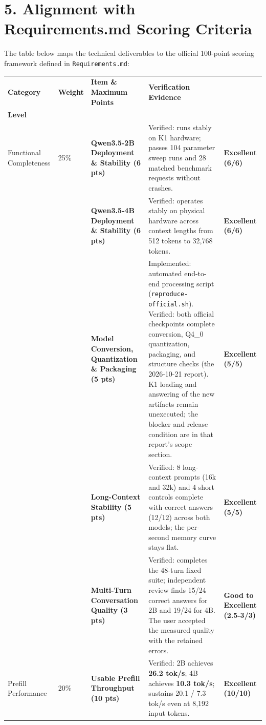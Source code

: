 \documentclass[10pt,a4paper]{article}
\begin{document}
\section{5. Alignment with Requirements.md Scoring Criteria}

The table below maps the technical deliverables to the official 100-point scoring framework defined in \texttt{Requirements.md}:

\begin{scriptsize}
\setlength{\tabcolsep}{1.5pt}
\begin{longtable}{@{}>{\raggedright\arraybackslash}p{2.6cm}p{1.1cm}p{4.1cm}p{5.7cm}p{2.5cm}@{}}
\toprule
\textbf{Category} & \textbf{Weight} & \textbf{Item \& Maximum Points} & \textbf{Verification Evidence} & \shortstack{\textbf{Rating}\\\textbf{Level}} \\
\midrule
\endhead
Functional Completeness & 25\% & \textbf{Qwen3.5-2B Deployment \& Stability (6 pts)} & Verified: runs stably on K1 hardware; passes 104 parameter sweep runs and 28 matched benchmark requests without crashes. & \textbf{Excellent (6/6)} \\
 & & \textbf{Qwen3.5-4B Deployment \& Stability (6 pts)} & Verified: operates stably on physical hardware across context lengths from 512 tokens to 32,768 tokens. & \textbf{Excellent (6/6)} \\
 & & \textbf{Model Conversion, Quantization \& Packaging (5 pts)} & Implemented: automated end-to-end processing script (\texttt{reproduce-official.sh}). Verified: both official checkpoints complete conversion, Q4\_0 quantization, packaging, and structure checks (the 2026-10-21 report). K1 loading and answering of the new artifacts remain unexecuted; the blocker and release condition are in that report's scope section. & \textbf{Excellent (5/5)} \\
 & & \textbf{Long-Context Stability (5 pts)} & Verified: 8 long-context prompts (16k and 32k) and 4 short controls complete with correct answers (12/12) across both models; the per-second memory curve stays flat. & \textbf{Excellent (5/5)} \\
 & & \textbf{Multi-Turn Conversation Quality (3 pts)} & Verified: completes the 48-turn fixed suite; independent review finds 15/24 correct answers for 2B and 19/24 for 4B. The user accepted the measured quality with the retained errors. & \textbf{Good to Excellent (2.5-3/3)} \\
\midrule
Prefill Performance & 20\% & \textbf{Usable Prefill Throughput (10 pts)} & Verified: 2B achieves \textbf{26.2 tok/s}; 4B achieves \textbf{10.3 tok/s}; sustains 20.1 / 7.3 tok/s even at 8,192 input tokens. & \textbf{Excellent (10/10)} \\

\end{longtable}
\end{scriptsize}
\end{document}

